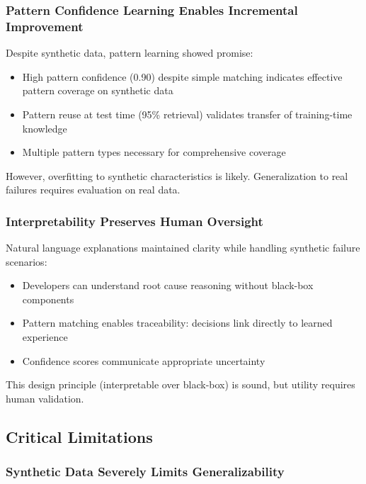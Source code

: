 \documentclass[11pt]{article}
\begin{document}
\subsubsection{Pattern Confidence Learning Enables Incremental Improvement}

Despite synthetic data, pattern learning showed promise:

\begin{itemize}
    \item High pattern confidence (0.90) despite simple matching indicates effective pattern coverage on synthetic data
    \item Pattern reuse at test time (95\% retrieval) validates transfer of training-time knowledge
    \item Multiple pattern types necessary for comprehensive coverage
\end{itemize}

However, overfitting to synthetic characteristics is likely. Generalization to real failures requires evaluation on real data.

\subsubsection{Interpretability Preserves Human Oversight}

Natural language explanations maintained clarity while handling synthetic failure scenarios:

\begin{itemize}
    \item Developers can understand root cause reasoning without black-box components
    \item Pattern matching enables traceability: decisions link directly to learned experience
    \item Confidence scores communicate appropriate uncertainty
\end{itemize}

This design principle (interpretable over black-box) is sound, but utility requires human validation.

\subsection{Critical Limitations}

\subsubsection{Synthetic Data Severely Limits Generalizability}
\end{document}
